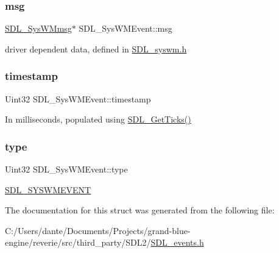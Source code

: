 \subsubsection{\texorpdfstring{msg}{msg}}
{\footnotesize\ttfamily \mbox{\hyperlink{struct_s_d_l___sys_w_mmsg}{S\+D\+L\+\_\+\+Sys\+W\+Mmsg}}$\ast$ S\+D\+L\+\_\+\+Sys\+W\+M\+Event\+::msg}

driver dependent data, defined in \mbox{\hyperlink{_s_d_l__syswm_8h}{S\+D\+L\+\_\+syswm.\+h}} \mbox{\label{struct_s_d_l___sys_w_m_event_a5d3cb97006d99b620c2671c27bd82c06}} 
\subsubsection{\texorpdfstring{timestamp}{timestamp}}
{\footnotesize\ttfamily Uint32 S\+D\+L\+\_\+\+Sys\+W\+M\+Event\+::timestamp}

In milliseconds, populated using \mbox{\hyperlink{_s_d_l__timer_8h_a0b9bc71d6287e0ffafdc3419760fe2b3}{S\+D\+L\+\_\+\+Get\+Ticks()}} \mbox{\label{struct_s_d_l___sys_w_m_event_a84697e96cb16bf6a570e10b5bfdcd392}} 
\subsubsection{\texorpdfstring{type}{type}}
{\footnotesize\ttfamily Uint32 S\+D\+L\+\_\+\+Sys\+W\+M\+Event\+::type}

\mbox{\hyperlink{_s_d_l__events_8h_a3b589e89be6b35c02e0dd34a55f3fccaa73749d735a18ce6ef17a09ee70d5dbe7}{S\+D\+L\+\_\+\+S\+Y\+S\+W\+M\+E\+V\+E\+NT}} 

The documentation for this struct was generated from the following file\+:\begin{DoxyCompactItemize}
\item 
C\+:/\+Users/dante/\+Documents/\+Projects/grand-\/blue-\/engine/reverie/src/third\+\_\+party/\+S\+D\+L2/\mbox{\hyperlink{_s_d_l__events_8h}{S\+D\+L\+\_\+events.\+h}}\end{DoxyCompactItemize}
